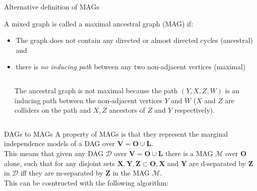 \documentclass[english, compress, red]{beamer}
\begin{document}
\begin{frame}{Alternative definition of MAGs}
	\begin{definition}A mixed graph is called a maximal ancestral graph (MAG) if:
		\begin{itemize}
			\item The graph does not contain any directed or almost directed cycles (ancestral) and
			\item there is \textit{no inducing path} between any two non-adjacent vertices (maximal)
		\end{itemize}
	\end{definition}
	\vspace{3pt}
	\begin{columns}
		\begin{column}{0.3\textwidth}
		\end{column}
	\begin{column}{0.7\textwidth}
		The ancestral graph is not maximal because the path $(Y,X,Z,W)$ is an inducing path between the non-adjacent vertices $Y$ and $W$ ($X$ and $Z$ are colliders on the path and $X,Z$ ancestors of $Z$ and $Y$ respectively).
	\end{column}
	\end{columns}
\end{frame}

\begin{frame}{DAGs to MAGs}
	A property of MAGs is that they represent the marginal independence models of a DAG over $\mathbf{V} = \mathbf{O} \cup \mathbf{L}$. \\
		
	This means that given any DAG $\mathcal{D}$ over $\mathbf{V} = \mathbf{O}\cup \mathbf{L}$ there is a MAG $\mathcal{M}$ over $\mathbf{O}$ alone, such that for any disjoint sets $\mathbf{X, Y, Z \subset O, X}$ and $\mathbf{Y}$ are d-separated by $\mathbf{Z}$ in $\mathcal{D}$ iff they are m-separated by $\mathbf{Z}$ in the MAG $\mathcal{M}$. \\
		
	This can be cosntructed with the following algorithm:
\end{frame}
\end{document}
